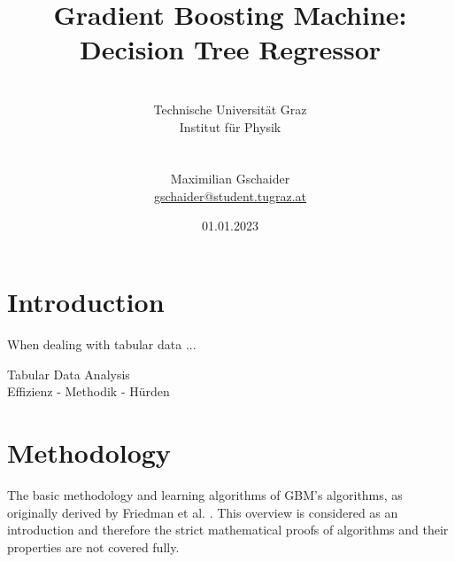 \documentclass[12pt, a4paper]{article}
\begin{document}
\cfoot*{\pagemark}%

\newpage 
\thispagestyle{empty}

\newpage
\clearpage

\title{Gradient Boosting Machine: \\ Decision Tree Regressor}
\author{\\Technische Universität Graz\\
Institut für Physik \\
\\\\Maximilian Gschaider\\ \href{mailto:gschaider@student.tugraz.at}{gschaider@student.tugraz.at} \\}
\date{01.01.2023}
\maketitle
\thispagestyle{empty}
\newpage 
\clearpage
\thispagestyle{empty}
\tableofcontents
\newpage
\clearpage
\setcounter{page}{1}
\section{Introduction}

When dealing with tabular data ...

Tabular Data Analysis \\
Effizienz - Methodik - Hürden \\

\section{Methodology}

The basic methodology and learning algorithms of GBM's algorithms, as originally derived by Friedman et al. \cite{Friedman2001}. This overview is considered as an introduction and therefore the strict mathematical proofs of algorithms and their properties are not covered fully.
\end{document}
